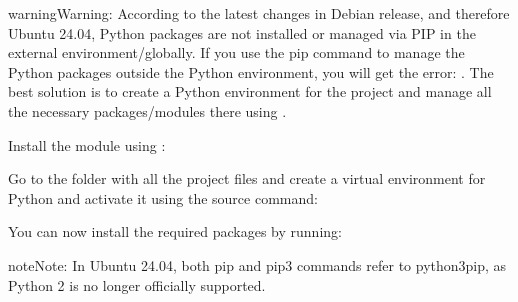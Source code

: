 \documentclass[letterpaper,10pt,english]{sphinxmanual}
\begin{document}
\begin{sphinxadmonition}{warning}{Warning:}
\sphinxAtStartPar
According to the latest changes in Debian release, and therefore Ubuntu 24.04, Python packages are not installed or managed via PIP in the external environment/globally. If you use the pip command to manage the Python packages outside the Python environment, you will get the error: . The best solution is to create a Python environment for the project and manage all the necessary packages/modules there using .
\end{sphinxadmonition}

\sphinxAtStartPar
Install the  module using :

\begin{sphinxVerbatim}[commandchars=\\\{\}]
   
\end{sphinxVerbatim}

\sphinxAtStartPar
Go to the folder with all the project files and create a virtual environment  for Python and activate it using the source command:

\begin{sphinxVerbatim}[commandchars=\\\{\}]
   
 
\end{sphinxVerbatim}

\sphinxAtStartPar
You can now install the required packages by running:

\begin{sphinxVerbatim}[commandchars=\\\{\}]
   
\end{sphinxVerbatim}

\begin{sphinxadmonition}{note}{Note:}
\sphinxAtStartPar
In Ubuntu 24.04, both pip and pip3 commands refer to python3\sphinxhyphen{}pip, as Python 2 is no longer officially supported.
\end{sphinxadmonition}
\end{document}
